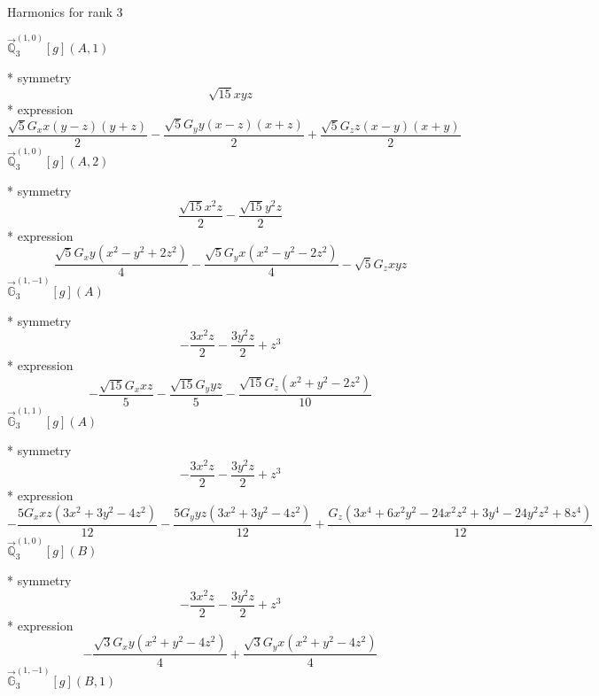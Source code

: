 \documentclass[fleqn,8pt]{jsarticle}
\begin{document}
\noindent * Harmonics for rank 3

\noindent\quad $\vec{\mathbb{Q}}_{3}^{(1,0)}[g](A,1)$

\noindent\quad ** symmetry
\begin{dmath*}
\sqrt{15} x y z
\end{dmath*}
\noindent\quad ** expression
\begin{dmath*}
\frac{\sqrt{5} G_{x} x \left(y - z\right) \left(y + z\right)}{2} - \frac{\sqrt{5} G_{y} y \left(x - z\right) \left(x + z\right)}{2} + \frac{\sqrt{5} G_{z} z \left(x - y\right) \left(x + y\right)}{2}
\end{dmath*}
\noindent\quad $\vec{\mathbb{Q}}_{3}^{(1,0)}[g](A,2)$

\noindent\quad ** symmetry
\begin{dmath*}
\frac{\sqrt{15} x^{2} z}{2} - \frac{\sqrt{15} y^{2} z}{2}
\end{dmath*}
\noindent\quad ** expression
\begin{dmath*}
\frac{\sqrt{5} G_{x} y \left(x^{2} - y^{2} + 2 z^{2}\right)}{4} - \frac{\sqrt{5} G_{y} x \left(x^{2} - y^{2} - 2 z^{2}\right)}{4} - \sqrt{5} G_{z} x y z
\end{dmath*}
\noindent\quad $\vec{\mathbb{G}}_{3}^{(1,-1)}[g](A)$

\noindent\quad ** symmetry
\begin{dmath*}
- \frac{3 x^{2} z}{2} - \frac{3 y^{2} z}{2} + z^{3}
\end{dmath*}
\noindent\quad ** expression
\begin{dmath*}
- \frac{\sqrt{15} G_{x} x z}{5} - \frac{\sqrt{15} G_{y} y z}{5} - \frac{\sqrt{15} G_{z} \left(x^{2} + y^{2} - 2 z^{2}\right)}{10}
\end{dmath*}
\noindent\quad $\vec{\mathbb{G}}_{3}^{(1,1)}[g](A)$

\noindent\quad ** symmetry
\begin{dmath*}
- \frac{3 x^{2} z}{2} - \frac{3 y^{2} z}{2} + z^{3}
\end{dmath*}
\noindent\quad ** expression
\begin{dmath*}
- \frac{5 G_{x} x z \left(3 x^{2} + 3 y^{2} - 4 z^{2}\right)}{12} - \frac{5 G_{y} y z \left(3 x^{2} + 3 y^{2} - 4 z^{2}\right)}{12} + \frac{G_{z} \left(3 x^{4} + 6 x^{2} y^{2} - 24 x^{2} z^{2} + 3 y^{4} - 24 y^{2} z^{2} + 8 z^{4}\right)}{12}
\end{dmath*}
\noindent\quad $\vec{\mathbb{Q}}_{3}^{(1,0)}[g](B)$

\noindent\quad ** symmetry
\begin{dmath*}
- \frac{3 x^{2} z}{2} - \frac{3 y^{2} z}{2} + z^{3}
\end{dmath*}
\noindent\quad ** expression
\begin{dmath*}
- \frac{\sqrt{3} G_{x} y \left(x^{2} + y^{2} - 4 z^{2}\right)}{4} + \frac{\sqrt{3} G_{y} x \left(x^{2} + y^{2} - 4 z^{2}\right)}{4}
\end{dmath*}
\noindent\quad $\vec{\mathbb{G}}_{3}^{(1,-1)}[g](B,1)$
\end{document}
